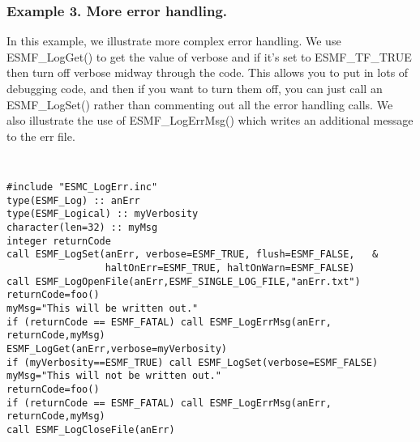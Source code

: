 \subsubsection{Example 3. More error handling.}

In this example, we illustrate more complex error handling.  We use
ESMF\_LogGet() to get the value of verbose and if it's set to ESMF\_TF\_TRUE
then turn off verbose midway through the code.  This allows you to put in lots
of debugging code, and then if you want to turn them off, you can just call
an ESMF\_LogSet() rather than commenting out all the error handling calls.
We also illustrate the use 
of ESMF\_LogErrMsg() which writes an additional message to the err file.

{\tt
\begin{verbatim}
#include "ESMC_LogErr.inc" 
type(ESMF_Log) :: anErr
type(ESMF_Logical) :: myVerbosity
character(len=32) :: myMsg
integer returnCode 
call ESMF_LogSet(anErr, verbose=ESMF_TRUE, flush=ESMF_FALSE,   &
                 haltOnErr=ESMF_TRUE, haltOnWarn=ESMF_FALSE)
call ESMF_LogOpenFile(anErr,ESMF_SINGLE_LOG_FILE,"anErr.txt")
returnCode=foo()
myMsg="This will be written out."
if (returnCode == ESMF_FATAL) call ESMF_LogErrMsg(anErr, returnCode,myMsg) 
ESMF_LogGet(anErr,verbose=myVerbosity)
if (myVerbosity==ESMF_TRUE) call ESMF_LogSet(verbose=ESMF_FALSE)
myMsg="This will not be written out."
returnCode=foo()
if (returnCode == ESMF_FATAL) call ESMF_LogErrMsg(anErr, returnCode,myMsg)
call ESMF_LogCloseFile(anErr)
\end{verbatim}
\tt}




